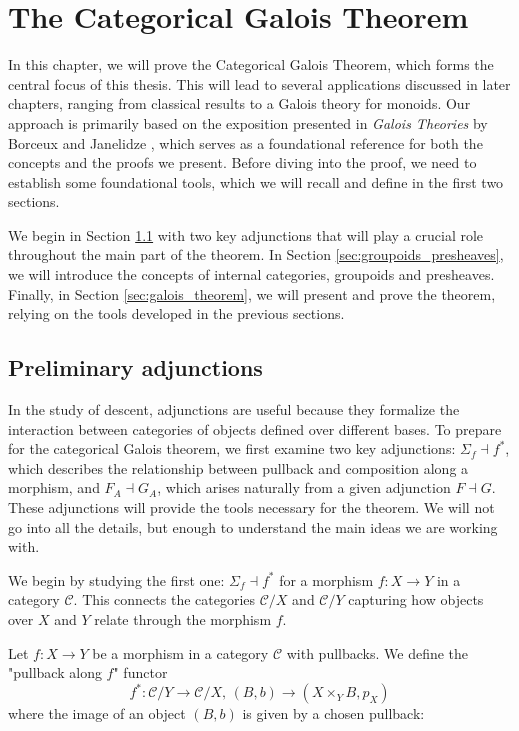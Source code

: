 \chapter{The Categorical Galois Theorem}
\label{cap:categorical_galois}

In this chapter, we will prove the Categorical Galois Theorem, which forms the central focus of this thesis. This will lead to several applications discussed in later chapters, ranging from classical results to a Galois theory for monoids. Our approach is primarily based on the exposition presented in \textit{Galois Theories} by Borceux and Janelidze \cite{borceux2001galois}, which serves as a foundational reference for both the concepts and the proofs we present. Before diving into the proof, we need to establish some foundational tools, which we will recall and define in the first two sections.

We begin in Section \ref{sec:preliminary_adjunctions} with two key adjunctions that will play a crucial role throughout the main part of the theorem. In Section \ref{sec:groupoids_presheaves}, we will introduce the concepts of internal categories, groupoids and presheaves. Finally, in Section \ref{sec:galois_theorem}, we will present and prove the theorem, relying on the tools developed in the previous sections.

\section{Preliminary adjunctions}
\label{sec:preliminary_adjunctions}
In the study of descent, adjunctions are useful because they formalize the interaction between categories of objects defined over different bases. To prepare for the categorical Galois theorem, we first examine two key adjunctions: $\Sigma_f\dashv f^*$, which describes the relationship between pullback and composition along a morphism, and $F_A\dashv G_A$, which arises naturally from a given adjunction $F\dashv G$. These adjunctions will provide the tools necessary for the theorem. We will not go into all the details, but enough to understand the main ideas we are working with.

We begin by studying the first one: $\Sigma_f\dashv f^*$ for a morphism $f:X\to Y$ in a category $\mathcal{C}$. This connects the categories $\mathcal{C}/X$ and $\mathcal{C}/Y$ capturing how objects over $X$ and $Y$ relate through the morphism $f$.

Let $f:X\to Y$ be a morphism in a category $\mathcal{C}$ with pullbacks. We define the "pullback along $f$" functor
\[ f^*:\mathcal{C}/Y\longrightarrow \mathcal{C}/X\text{, }(B,b)\to (X\times_YB, p_X) \]
where the image of an object $(B,b)$ is given by a chosen pullback:
\begin{center}
\end{center}

